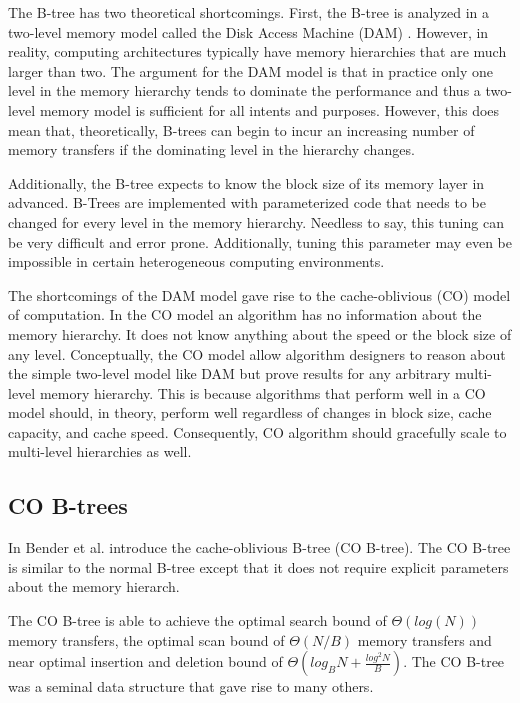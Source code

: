 \documentclass{style}
\begin{document}
The B-tree has two theoretical shortcomings. First, the B-tree is analyzed in
a two-level memory model called the Disk Access Machine (DAM) \cite{Aggarwal}.
However, in reality, computing architectures typically have memory hierarchies
that are much larger than two. The argument for the DAM model is that in
practice only one level in the memory hierarchy tends to dominate the
performance and thus a two-level memory model is sufficient for all intents
and purposes. However, this does mean that, theoretically, B-trees can begin
to incur an increasing number of memory transfers if the dominating level in
the hierarchy changes.

Additionally, the B-tree expects to know the block size of its memory layer in
advanced. B-Trees are implemented with parameterized code that needs to be
changed for every level in the memory hierarchy. Needless to say, this tuning
can be very difficult and error prone. Additionally, tuning this parameter may
even be impossible in certain heterogeneous computing environments.

The shortcomings of the DAM model gave rise to the cache-oblivious (CO) model
of computation. In the CO model an algorithm has no information about the
memory hierarchy. It does not know anything about the speed or the block size
of any level. Conceptually, the CO model allow algorithm designers to reason
about the simple two-level model like DAM but prove results for any arbitrary
multi-level memory hierarchy. This is because algorithms that perform well in
a CO model should, in theory, perform well regardless of changes in block
size, cache capacity, and cache speed. Consequently, CO algorithm should
gracefully scale to multi-level hierarchies as well.

\subsection{CO B-trees}

In \cite{BenderDemainColton} Bender et al. introduce the cache-oblivious
B-tree (CO B-tree). The CO B-tree is similar to the normal B-tree except that
it does not require explicit parameters about the memory hierarch.

The CO B-tree is able to achieve the optimal search bound of $\Theta(log(N))$
memory transfers, the optimal scan bound of $\Theta(N/B)$ memory transfers and
near optimal insertion and deletion bound of $\Theta(log_B N +
\frac{log^2{N}}{B})$. The CO B-tree was a seminal data structure that gave
rise to many others.
\end{document}
